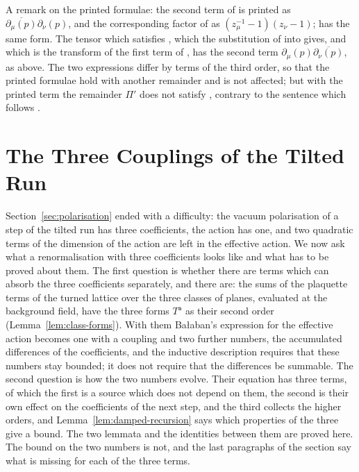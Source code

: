 \documentclass[11pt]{preprint}
\numberwithin{equation}{section}
\theoremstyle{definition}
\theoremstyle{remark}
\theoremstyle{plain}
\begin{document}
A remark on the printed formulae: the second term of \cite[(5.16), (5.37)]{BalabanRG1} is printed as $\overline{\partial_\mu(p)}\partial_\nu(p)$, and the corresponding factor of \cite[(5.33), (5.35), (5.36)]{BalabanRG1} as $(z_\mu^{-1} - 1)(z_\nu - 1)$; \cite[(4.41)]{BalabanRG1} has the same form. The tensor which satisfies \cite[(5.15), (5.19)]{BalabanRG1}, which the substitution of \cite[(5.30)]{BalabanRG1} into \cite[(5.26)]{BalabanRG1} gives, and which is the transform \cite[(5.11)]{BalabanRG1} of the first term of \cite[(5.43)]{BalabanRG1}, has the second term $\partial_\mu(p)\overline{\partial_\nu(p)}$, as above. The two expressions differ by terms of the third order, so that the printed formulae hold with another remainder and \cite[(5.42)]{BalabanRG1} is not affected; but with the printed term the remainder $\Pi'$ does not satisfy \cite[(5.15)]{BalabanRG1}, contrary to the sentence which follows \cite[(5.37)]{BalabanRG1}.

\section{The Three Couplings of the Tilted Run}\label{sec:three-couplings}

Section~\ref{sec:polarisation} ended with a difficulty: the vacuum polarisation of a step of the tilted run has three coefficients, the action has one, and two quadratic terms of the dimension of the action are left in the effective action. We now ask what a renormalisation with three coefficients looks like and what has to be proved about them. The first question is whether there are terms which can absorb the three coefficients separately, and there are: the sums of the plaquette terms of the turned lattice over the three classes of planes, evaluated at the background field, have the three forms $T^{\mathsf a}$ as their second order (Lemma~\ref{lem:class-forms}). With them Ba{\l}aban's expression for the effective action becomes one with a coupling and two further numbers, the accumulated differences of the coefficients, and the inductive description requires that these numbers stay bounded; it does not require that the differences be summable. The second question is how the two numbers evolve. Their equation has three terms, of which the first is a source which does not depend on them, the second is their own effect on the coefficients of the next step, and the third collects the higher orders, and Lemma~\ref{lem:damped-recursion} says which properties of the three give a bound. The two lemmata and the identities between them are proved here. The bound on the two numbers is not, and the last paragraphs of the section say what is missing for each of the three terms.
\end{document}
